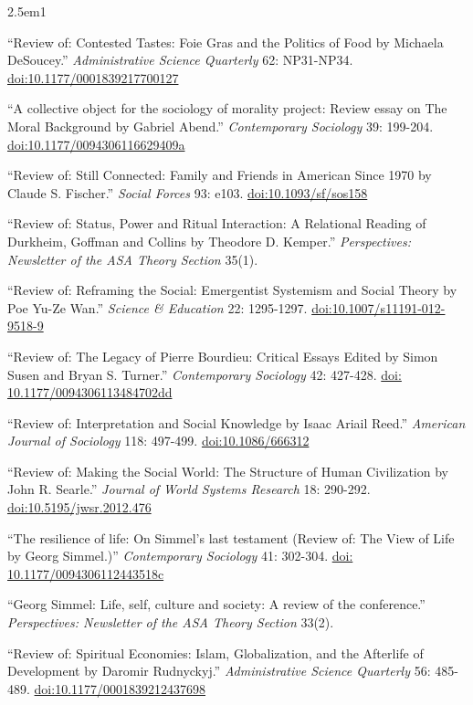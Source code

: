 \documentclass[
]{article}
\newenvironment{cventry}{\begin{hangparas}{2.5em}{1}}{\end{hangparas}}
\begin{document}
\begin{cventry}

``Review of: Contested Tastes: Foie Gras and the Politics of Food by
Michaela DeSoucey.'' \emph{Administrative Science Quarterly} 62:
NP31-NP34.
\href{https://doi.org/10.1177/0001839217700127}{doi:10.1177/0001839217700127}

``A collective object for the sociology of morality project: Review
essay on The Moral Background by Gabriel Abend.'' \emph{Contemporary
Sociology} 39: 199-204.
\href{https://doi.org/10.1177/0094306116629409a}{doi:10.1177/0094306116629409a}

``Review of: Still Connected: Family and Friends in American Since 1970
by Claude S. Fischer.'' \emph{Social Forces} 93: e103.
\href{https://doi.org/10.1093/sf/sos158}{doi:10.1093/sf/sos158}

``Review of: Status, Power and Ritual Interaction: A Relational Reading
of Durkheim, Goffman and Collins by Theodore D. Kemper.''
\emph{Perspectives: Newsletter of the ASA Theory Section} 35(1).

``Review of: Reframing the Social: Emergentist Systemism and Social
Theory by Poe Yu-Ze Wan.'' \emph{Science \& Education} 22: 1295-1297.
\href{https://doi.org/10.1007/s11191-012-9518-9}{doi:10.1007/s11191-012-9518-9}

``Review of: The Legacy of Pierre Bourdieu: Critical Essays Edited by
Simon Susen and Bryan S. Turner.'' \emph{Contemporary Sociology} 42:
427-428. \href{https://doi.org/10.1177/0094306113484702dd}{doi:
10.1177/0094306113484702dd}

``Review of: Interpretation and Social Knowledge by Isaac Ariail Reed.''
\emph{American Journal of Sociology} 118: 497-499.
\href{https://doi.org/10.1086/666312}{doi:10.1086/666312}

``Review of: Making the Social World: The Structure of Human
Civilization by John R. Searle.'' \emph{Journal of World Systems
Research} 18: 290-292.
\href{https://doi.org/10.5195/jwsr.2012.476}{doi:10.5195/jwsr.2012.476}

``The resilience of life: On Simmel's last testament (Review of: The
View of Life by Georg Simmel.)'' \emph{Contemporary Sociology} 41:
302-304. \href{https://doi.org/10.1177/0094306112443518c}{doi:
10.1177/0094306112443518c}

``Georg Simmel: Life, self, culture and society: A review of the
conference.'' \emph{Perspectives: Newsletter of the ASA Theory Section}
33(2).

``Review of: Spiritual Economies: Islam, Globalization, and the
Afterlife of Development by Daromir Rudnyckyj.'' \emph{Administrative
Science Quarterly} 56: 485-489.
\href{https://doi.org/10.1177/0001839212437698}{doi:10.1177/0001839212437698}

\end{cventry}
\end{document}
